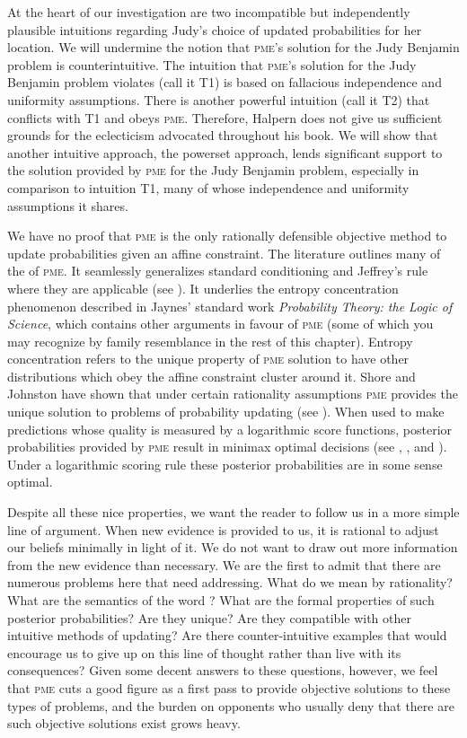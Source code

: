 \documentclass[phd,12pt,oneside]{ubcthesis}
\begin{document}
At the heart of our investigation are two incompatible but
independently plausible intuitions regarding Judy's choice of updated
probabilities for her location. We will undermine the notion that
\textsc{pme}'s solution for the Judy Benjamin problem is
counterintuitive. The intuition that \textsc{pme}'s solution for
the Judy Benjamin problem violates (call it T1) is based on fallacious
independence and uniformity assumptions. There is another powerful
intuition (call it T2) that conflicts with T1 and obeys
\textsc{pme}. Therefore, Halpern does not give us sufficient
grounds for the eclecticism advocated throughout his book. We will
show that another intuitive approach, the powerset approach, lends
significant support to the solution provided by \textsc{pme} for
the Judy Benjamin problem, especially in comparison to intuition T1,
many of whose independence and uniformity assumptions it shares. 

We have no proof that \textsc{pme} is the only rationally
defensible objective method to update probabilities given an affine
constraint. The literature outlines many of the  of \textsc{pme}. It seamlessly generalizes standard
conditioning and Jeffrey's rule where they are applicable (see
). It underlies the entropy concentration
phenomenon described in Jaynes' standard work \emph{Probability
  Theory: the Logic of Science}, which contains other arguments in
favour of \textsc{pme} (some of which you may recognize by family
resemblance in the rest of this chapter). Entropy concentration refers
to the unique property of \textsc{pme} solution to have other
distributions which obey the affine constraint cluster around it.
Shore and Johnston have shown that under certain rationality
assumptions \textsc{pme} provides the unique solution to problems
of probability updating (see ). When used
to make predictions whose quality is measured by a logarithmic score
functions, posterior probabilities provided by \textsc{pme} result
in minimax optimal decisions (see ,
, and ). Under a
logarithmic scoring rule these posterior probabilities are in some
sense optimal.

Despite all these nice properties, we want the reader to follow us in
a more simple line of argument. When new evidence is provided to us,
it is rational to adjust our beliefs minimally in light of it. We do
not want to draw out more information from the new evidence than
necessary. We are the first to admit that there are numerous problems
here that need addressing. What do we mean by rationality? What are
the semantics of the word ? What are the formal
properties of such posterior probabilities? Are they unique? Are they
compatible with other intuitive methods of updating? Are there
counter-intuitive examples that would encourage us to give up on this
line of thought rather than live with its consequences? Given some
decent answers to these questions, however, we feel that
\textsc{pme} cuts a good figure as a first pass to provide
objective solutions to these types of problems, and the burden on
opponents who usually deny that there are such objective solutions
exist grows heavy.
\end{document}
